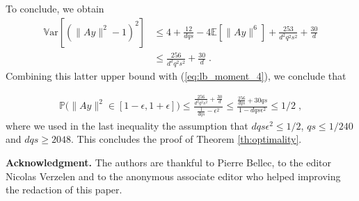 \documentclass{ps}
\renewcommand{\P}{\mathbb{P}}
\newcommand{\E}{\mathbb{E}}
\newcommand{\Var}{\mathbb{V}\!\mathrm{ar}}
\newcommand{\1}{\mathbbm{1}}
\theoremstyle{plain}
\begin{document}
To conclude, we obtain 
\begin{align*}
	\Var\left[ (\|Ay\|^2 - 1)^2\right] &\leq 4 + \frac{12}{dqs} - 4\E[\|Ay\|^6] + \frac{253}{d^2q^2s^2} + \frac{30}{d} \\
	&\leq \frac{256}{d^2q^2s^2} + \frac{30}{d} \; .
\end{align*}
Combining this latter upper bound with (\ref{eq:lb_moment_4}), we conclude that

\begin{align*}
	\P\big(\|Ay\|^2 \in [1-\epsilon, 1+\epsilon]\big) \leq \frac{\frac{256}{d^2q^2s^2} + \frac{30}{d}}{\frac{1}{dqs} - \epsilon^2} \leq  \frac{\frac{256}{dqs} + 30qs}{1- dqs\epsilon^2} \leq 1/2\; ,
\end{align*}
where we used in the last inequality the assumption that $dqs\epsilon^2 \leq 1/2$, $qs \leq 1/240$ and $dqs \geq 2048$. This concludes the proof of Theorem \ref{th:optimality}.

\medskip

\noindent
{\bf Acknowledgment.}
The authors are thankful to Pierre Bellec, to the editor Nicolas Verzelen and to the anonymous associate editor who helped improving the redaction of this paper.




\end{document}
